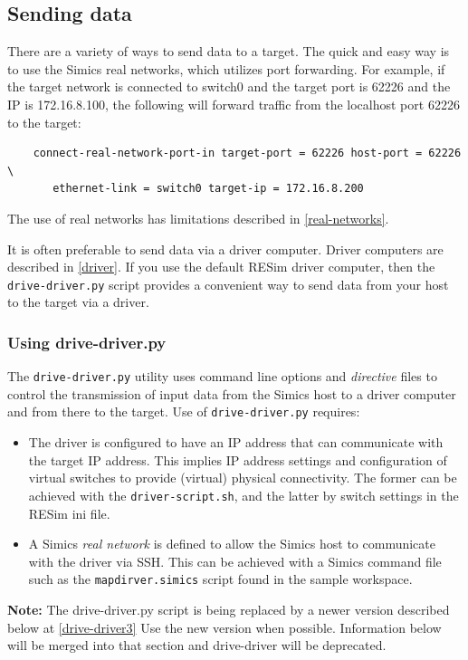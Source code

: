 \documentclass[titlepage]{article}
\begin{document}
\subsection{Sending data}
\label{sending-data}
There are a variety of ways to send data to a target.  The quick and easy way is to use the Simics real networks, which utilizes
port forwarding.  For example, if the target network is connected to switch0 and the target port is 62226 and the IP is
172.16.8.100, the following will forward traffic from the localhost port 62226 to the target: 
\begin{verbatim}
    connect-real-network-port-in target-port = 62226 host-port = 62226 \
       ethernet-link = switch0 target-ip = 172.16.8.200
\end{verbatim}
The use of real networks has limitations described in \ref{real-networks}.

It is often preferable to send data via a driver computer. Driver computers are described in \ref{driver}.  If you use the default RESim driver computer, then the
{\tt drive-driver.py} script provides a convenient way to send data from your host to the target via a driver.

\subsubsection{Using drive-driver.py}
\label{drive-driver}
The {\tt drive-driver.py} utility uses command line options and \textit{directive} files to control the transmission of input 
data from the Simics host to a driver computer and from there to the target.  Use of {\tt drive-driver.py} requires:
\begin{itemize}
\item The driver is configured to have an IP address that can communicate with the target IP address.  This implies IP address settings and configuration
of virtual switches to provide (virtual) physical connectivity.  The former can be achieved with the {\tt driver-script.sh}, and the latter by switch settings
in the RESim ini file.
\item A Simics \textit{real network} is defined to allow the Simics host to communicate with the driver via SSH.  This can be achieved with a 
Simics command file such as the {\tt mapdirver.simics} script found in the sample workspace.
\end{itemize}

\textbf{Note:} The drive-driver.py script is being replaced by a newer version described below at \ref{drive-driver3}  Use the new version when possible.
Information below will be merged into that section and drive-driver will be deprecated.
\end{document}

